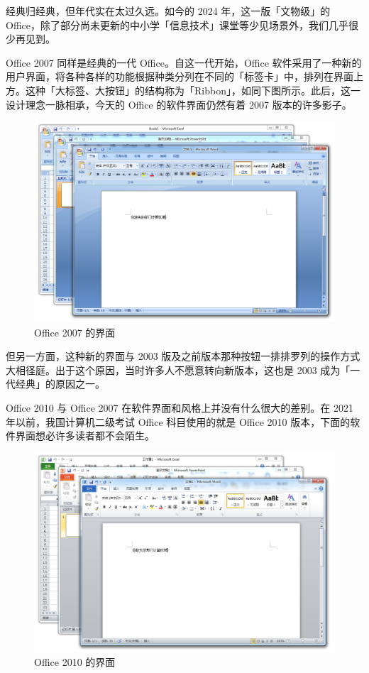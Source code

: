 经典归经典，但年代实在太过久远。如今的 2024 年，这一版「文物级」的 Office，除了部分尚未更新的中小学「信息技术」课堂等少见场景外，我们几乎很少再见到。

Office 2007 同样是经典的一代 Office。自这一代开始，Office 软件采用了一种新的用户界面，将各种各样的功能根据种类分列在不同的「标签卡」中，排列在界面上方。这种「大标签、大按钮」的结构称为「Ribbon」，如同下图所示。此后，这一设计理念一脉相承，今天的 Office 的软件界面仍然有着 2007 版本的许多影子。

\begin{figure}[htb!]
  \centering
  \includegraphics[width=.81\textwidth]{assets/software/Office_2007.png}
  \caption{Office 2007 的界面}
  \label{fig:Office_2007}
\end{figure}

但另一方面，这种新的界面与 2003 版及之前版本那种按钮一排排罗列的操作方式大相径庭。出于这个原因，当时许多人不愿意转向新版本，这也是 2003 成为「一代经典」的原因之一。

Office 2010 与 Office 2007 在软件界面和风格上并没有什么很大的差别。在 2021 年以前，我国计算机二级考试 Office 科目使用的就是 Office 2010 版本，下面的软件界面想必许多读者都不会陌生。

\begin{figure}[htb!]
  \centering
  \includegraphics[width=.81\textwidth]{assets/software/Office_2010.png}
  \caption{Office 2010 的界面}
  \label{fig:Office_2010}
\end{figure}

